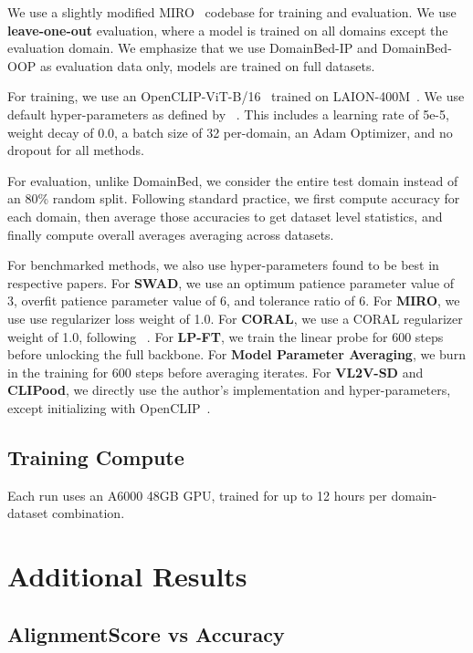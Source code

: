 \documentclass{article} %
\begin{document}
We use a slightly modified MIRO~\citep{cha2022miro} codebase for training and evaluation. We use \textbf{leave-one-out} evaluation, where a model is trained on all domains except the evaluation domain. We emphasize that we use DomainBed-IP and DomainBed-OOP as evaluation data only, models are trained on full datasets. 

For training, we use an OpenCLIP-ViT-B/16~\citep{ilharco_gabriel_2021_5143773} trained on LAION-400M~\citep{Schuhmann2021LAION400MOD}. We use default hyper-parameters as defined by ~\citep{cha2022miro}. This includes a learning rate of 5e-5, weight decay of 0.0, a batch size of 32 per-domain, an Adam Optimizer, and no dropout for all methods. 

For evaluation, unlike DomainBed, we consider the entire test domain instead of an 80\% random split. Following standard practice, we first compute accuracy for each domain, then average those accuracies to get dataset level statistics, and finally compute overall averages averaging across datasets. 

For benchmarked methods, we also use hyper-parameters found to be best in respective papers. For \textbf{SWAD}, we use an optimum patience parameter value of 3, overfit patience parameter value of 6, and tolerance ratio of 6. For \textbf{MIRO}, we use use regularizer loss weight of 1.0. For \textbf{CORAL}, we use a CORAL regularizer weight of 1.0, following ~\citep{cha2021swad}. For \textbf{LP-FT}, we train the linear probe for 600 steps before unlocking the full backbone.  For \textbf{Model Parameter Averaging}, we burn in the training for 600 steps before averaging iterates. For \textbf{VL2V-SD} and \textbf{CLIPood}, we directly use the author's implementation and hyper-parameters, except initializing with OpenCLIP~\citep{ilharco_gabriel_2021_5143773}.  

\subsection{Training Compute}

Each run uses an A6000 48GB GPU, trained for up to 12 hours per domain-dataset combination.

\section{Additional  Results}






\subsection{AlignmentScore vs Accuracy}
\end{document}
